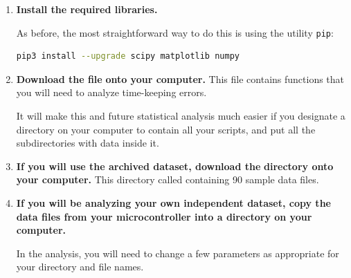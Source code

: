 \begin{enumerate}
	\item \textbf{Install the required \python libraries.}
	
	As before, the most straightforward way to do this is using the utility \lstinline{pip}:
\begin{lstlisting}[language=bash]
pip3 install --upgrade scipy matplotlib numpy
\end{lstlisting}	
	
	\item \textbf{Download the file}  \textbf{ onto your computer.}
	This file contains functions that you will need to analyze time-keeping errors.
	
	\smallskip
	It will make this and future statistical analysis much easier if you designate a directory on your computer to contain all your \python scripts, and put all the subdirectories with data inside it.
	
	
	\item \textbf{If you will use the archived dataset, download the}  \textbf{ directory onto your computer.}
	This directory called containing 90 sample data files.
		
	\item \textbf{If you will be analyzing your own independent dataset, copy the data files from your microcontroller into a directory on your computer.}
	
	In the analysis, you will need to change a few parameters as appropriate for your directory and file names.
	

\end{enumerate}
